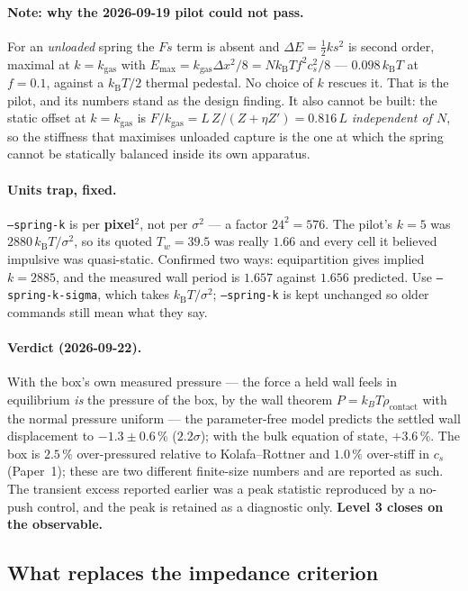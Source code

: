 \documentclass[11pt,a4paper]{article}
\newcommand{\kT}{k_{\mathrm B}T}
\newcommand{\cmd}[1]{\texttt{\footnotesize #1}}
\begin{document}
\paragraph{Note: why the 2026-09-19 pilot could not pass.} For an \emph{unloaded} spring the $Fs$
term is absent and $\Delta E = \tfrac12 k s^2$ is second order, maximal at $k = k_{\mathrm{gas}}$
with $E_{\mathrm{max}} = k_{\mathrm{gas}}\Delta x^2/8 = N\kT f^2 c_s^2/8$ --- $0.098\,\kT$ at
$f = 0.1$, against a $\kT/2$ thermal pedestal. No choice of $k$ rescues it. That is the pilot, and
its numbers stand as the design finding. It also cannot be built: the static offset at
$k = k_{\mathrm{gas}}$ is $F/k_{\mathrm{gas}} = L\,Z/(Z+\eta Z') = 0.816\,L$ \emph{independent of
$N$}, so the stiffness that maximises unloaded capture is the one at which the spring cannot be
statically balanced inside its own apparatus.

\paragraph{Units trap, fixed.} \cmd{--spring-k} is per \textbf{pixel$^2$}, not per $\sigma^2$ --- a
factor $24^2 = 576$. The pilot's $k = 5$ was $2880\,\kT/\sigma^2$, so its quoted $T_w = 39.5$ was
really $1.66$ and every cell it believed impulsive was quasi-static. Confirmed two ways:
equipartition gives implied $k = 2885$, and the measured wall period is $1.657$ against $1.656$
predicted. Use \cmd{--spring-k-sigma}, which takes $\kT/\sigma^2$; \cmd{--spring-k} is kept
unchanged so older commands still mean what they say.

\paragraph{Verdict (2026-09-22).} With the box's own measured pressure --- the force a held wall
feels in equilibrium \emph{is} the pressure of the box, by the wall theorem
$P = k_BT\rho_{\mathrm{contact}}$ with the normal pressure uniform --- the parameter-free model
predicts the settled wall displacement to $-1.3 \pm 0.6\,\%$ ($2.2\sigma$); with the bulk equation
of state, $+3.6\,\%$. The box is $2.5\,\%$ over-pressured relative to Kolafa--Rottner and
$1.0\,\%$ over-stiff in $c_s$ (Paper~1); these are two different finite-size numbers and are
reported as such. The transient excess reported earlier was a peak statistic reproduced by a
no-push control, and the peak is retained as a diagnostic only. \textbf{Level 3 closes on the
observable.}

\subsection{What replaces the impedance criterion}\label{sec:l3acoustic}
\end{document}
